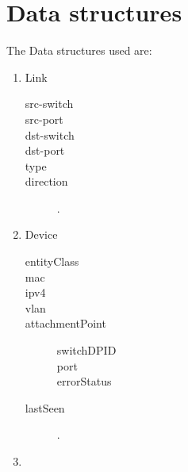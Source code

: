 \chapter{Data structures}


The Data structures used are:\\

\begin{enumerate}

\item Link
	\begin{description}
	\item[src-switch ]
	\item[src-port]
	\item[dst-switch]
	\item[dst-port]
	\item[type]
	\item[direction] .\\
	\end{description}

\item Device
	\begin{description}
	\item[entityClass ]
	\item[mac]
	\item[ipv4]
	\item[vlan]
	\item[attachmentPoint]
		\begin{description}
		\item[switchDPID]
		\item[port]
		\item[errorStatus] 
	\end{description}
 	\item[lastSeen] .\\
	\end{description}

\item 

\end{enumerate}



